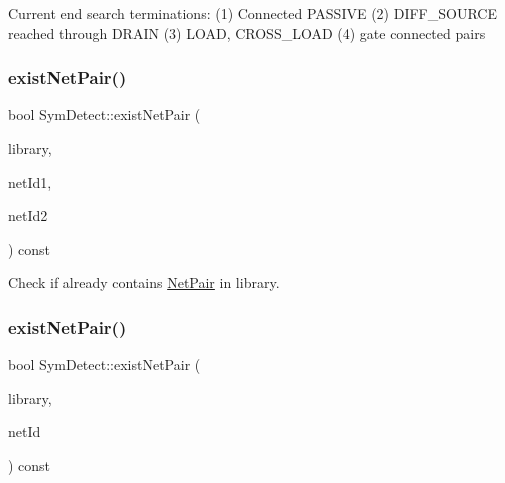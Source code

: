 Current end search terminations\+: (1) Connected P\+A\+S\+S\+I\+VE (2) D\+I\+F\+F\+\_\+\+S\+O\+U\+R\+CE reached through D\+R\+A\+IN (3) L\+O\+AD, C\+R\+O\+S\+S\+\_\+\+L\+O\+AD (4) gate connected pairs \mbox{\label{classSymDetect_a0e73f6d9d0b83b0c42c569fc42f8ecd2}} 
\subsubsection{\texorpdfstring{exist\+Net\+Pair()}{existNetPair()}\hspace{0.1cm}{\footnotesize\ttfamily [1/2]}}
{\footnotesize\ttfamily bool Sym\+Detect\+::exist\+Net\+Pair (\begin{DoxyParamCaption}\item[{std\+::vector$<$ \hyperlink{classNetPair}{Net\+Pair} $>$ \&}]{library,  }\item[{\hyperlink{type_8h_a581e8093e28e7362f2b6937296190676}{Index\+Type}}]{net\+Id1,  }\item[{\hyperlink{type_8h_a581e8093e28e7362f2b6937296190676}{Index\+Type}}]{net\+Id2 }\end{DoxyParamCaption}) const\hspace{0.3cm}{\ttfamily [private]}}



Check if already contains \hyperlink{classNetPair}{Net\+Pair} in library. 

\mbox{\label{classSymDetect_a04b449b545fe7d175e4733b3f602c41c}} 
\subsubsection{\texorpdfstring{exist\+Net\+Pair()}{existNetPair()}\hspace{0.1cm}{\footnotesize\ttfamily [2/2]}}
{\footnotesize\ttfamily bool Sym\+Detect\+::exist\+Net\+Pair (\begin{DoxyParamCaption}\item[{std\+::vector$<$ \hyperlink{classNetPair}{Net\+Pair} $>$ \&}]{library,  }\item[{\hyperlink{type_8h_a581e8093e28e7362f2b6937296190676}{Index\+Type}}]{net\+Id }\end{DoxyParamCaption}) const\hspace{0.3cm}{\ttfamily [private]}}



